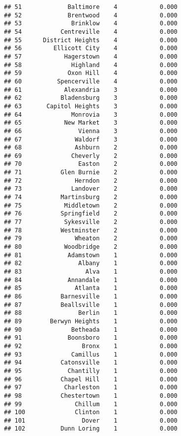 \documentclass[]{article}
\begin{document}
\begin{verbatim}
## 51             Baltimore    4            0.000
## 52             Brentwood    4            0.000
## 53              Brinklow    4            0.000
## 54           Centreville    4            0.000
## 55      District Heights    4            0.000
## 56         Ellicott City    4            0.000
## 57            Hagerstown    4            0.000
## 58              Highland    4            0.000
## 59             Oxon Hill    4            0.000
## 60          Spencerville    4            0.000
## 61            Alexandria    3            0.000
## 62           Bladensburg    3            0.000
## 63       Capitol Heights    3            0.000
## 64              Monrovia    3            0.000
## 65            New Market    3            0.000
## 66                Vienna    3            0.000
## 67               Waldorf    3            0.000
## 68               Ashburn    2            0.000
## 69              Cheverly    2            0.000
## 70                Easton    2            0.000
## 71           Glen Burnie    2            0.000
## 72               Herndon    2            0.000
## 73              Landover    2            0.000
## 74           Martinsburg    2            0.000
## 75            Middletown    2            0.000
## 76           Springfield    2            0.000
## 77            Sykesville    2            0.000
## 78           Westminster    2            0.000
## 79               Wheaton    2            0.000
## 80            Woodbridge    2            0.000
## 81             Adamstown    1            0.000
## 82                Albany    1            0.000
## 83                  Alva    1            0.000
## 84             Annandale    1            0.000
## 85               Atlanta    1            0.000
## 86           Barnesville    1            0.000
## 87           Beallsville    1            0.000
## 88                Berlin    1            0.000
## 89        Berwyn Heights    1            0.000
## 90              Betheada    1            0.000
## 91             Boonsboro    1            0.000
## 92                 Bronx    1            0.000
## 93              Camillus    1            0.000
## 94           Catonsville    1            0.000
## 95             Chantilly    1            0.000
## 96           Chapel Hill    1            0.000
## 97            Charleston    1            0.000
## 98           Chestertown    1            0.000
## 99               Chillum    1            0.000
## 100              Clinton    1            0.000
## 101                Dover    1            0.000
## 102          Dunn Loring    1            0.000

\end{verbatim}
\end{document}
